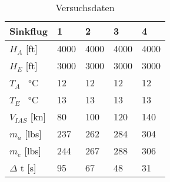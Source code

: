 \begin{table}[h]
	\centering
	\begin{tabular}{| l | l | l | l | l | }
\hline
	Sinkflug & 1 & 2 & 3 & 4 \\ \hline
	$H_A$ [ft] & 4000 & 4000 & 4000 & 4000 \\ \hline
	$H_E$ [ft]  & 3000 & 3000 & 3000 & 3000 \\ \hline
	$T_A$  \SI{}{\celsius} & 12 & 12 & 12 & 12 \\ \hline
	$T_E$  \SI{}{\celsius} & 13 & 13 & 13 & 13 \\ \hline
	$V_{IAS}$ [kn] & 80 & 100 & 120 & 140 \\ \hline
	$m_a$ [lbs] & 237 & 262 & 284 & 304 \\ \hline
	$m_e$ [lbs] & 244 & 267 & 288 & 306 \\ \hline
	$\Delta$ t [s] & 95 & 67 & 48 & 31 \\ \hline
\end{tabular}
	\caption{Versuchsdaten}
	\label{tab:VersuchDaten2}
\end{table}

